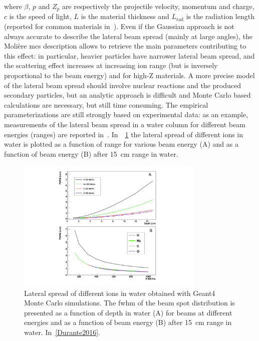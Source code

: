 where $\beta$, $p$ and $Z_{p}$ are respectively the projectile velocity, momentum and charge, $c$ is the speed of light,  $L$ is the material thickness and $L_{\mathrm{rad}}$ is the radiation length (reported for common materials in~\cite{Tsai1974}). 
Even if the Gaussian approach is not always accurate to describe the lateral beam spread (mainly at large angles), the Moli\`{e}re \gls{mcs} description allows to retrieve the main parameters contributing to this effect: in particular, heavier particles have narrower lateral beam spread, and the scattering effect increases at increasing ion range (but is inversely proportional to the beam energy) and for high-Z materials. A more precise model of the lateral beam spread should involve nuclear reactions and the produced secondary particles, but an analytic approach is difficult and Monte Carlo based calculations are necessary, but still time consuming. The empirical parameterizations are still strongly based on experimental data: as an example, measurements of the lateral beam spread in a water column for different beam energies (ranges) are reported in~\cite{Pedroni2005}. In~\figurename~\ref{chap1::fig::latSpread} the lateral spread of different ions in water is plotted as a function of range for various beam energy (A) and as a function of beam energy (B) after 15~cm range in water.

\begin{figure}[!htbp]
\centering
\includegraphics[width=0.8\textwidth]{03_GraphicFiles/chapter1_Introduction/lateralSpread.pdf}
\caption{Lateral spread of different ions in water obtained with Geant4 Monte Carlo simulations. The \gls{fwhm} of the beam spot distribution is presented as a function of depth in water (A) for beams at different energies and as a function of beam energy (B) after 15~cm range in water. In~\ref{Durante2016}.}
\label{chap1::fig::latSpread}
\end{figure}   

